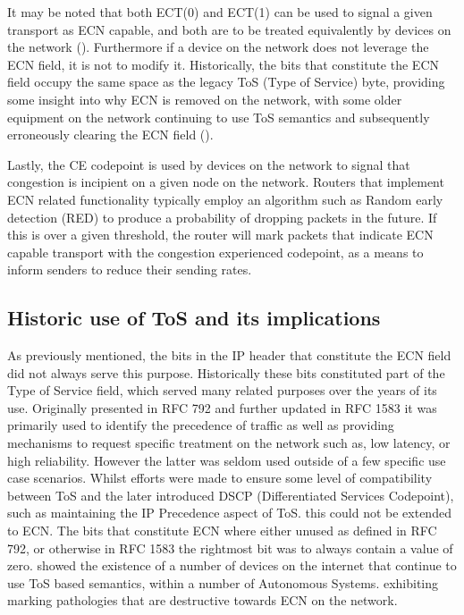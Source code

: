 \documentclass{l4proj}
\begin{document}
It may be noted that both ECT(0) and ECT(1) can be used to signal a given transport as ECN capable, and both are to be treated equivalently by devices on the network (\cite{floyd_addition_2001}). Furthermore if a device on the network does not leverage the ECN field, it is not to modify it. Historically, the bits that constitute the ECN field occupy the same space as the legacy ToS (Type of Service) byte, providing some insight into why ECN is removed on the network, with some older equipment on the network continuing to use ToS semantics and subsequently erroneously clearing the ECN field (\cite{kuhlewind_state_2013}).

Lastly, the CE codepoint is used by devices on the network to signal that congestion is incipient on a given node on the network. Routers that implement ECN related functionality typically employ an algorithm such as Random early detection (RED) to produce a probability of dropping packets in the future. If this is over a given threshold, the router will mark packets that indicate ECN capable transport with the congestion experienced codepoint, as a means to inform senders to reduce their sending rates.

\subsection{Historic use of ToS and its implications}

As previously mentioned, the bits in the IP header that constitute the ECN field did not always serve this purpose. Historically these bits constituted part of the Type of Service field, which served many related purposes over the years of its use. Originally presented in RFC 792 and further updated in RFC 1583 it was primarily used to identify the precedence of traffic as well as providing mechanisms to request specific treatment on the network such as, low latency, or high reliability. However the latter was seldom used outside of a few specific use case scenarios. Whilst efforts were made to ensure some level of compatibility between ToS and the later introduced DSCP (Differentiated Services Codepoint), such as maintaining the IP Precedence aspect of ToS. this could not be extended to ECN. The bits that constitute ECN where either unused as defined in RFC 792, or otherwise in RFC 1583 the rightmost bit was to always contain a value of zero. \cite{custura_exploring_2017} showed the existence of a number of devices on the internet that continue to use ToS based semantics, within a number of Autonomous Systems. exhibiting marking pathologies that are destructive towards ECN on the network.
\end{document}
